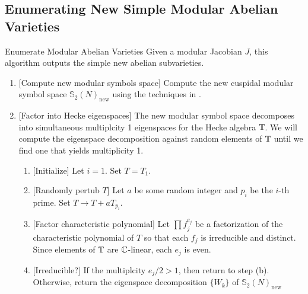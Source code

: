 \documentclass{article}
\begin{document}

\subsection{Enumerating New Simple Modular Abelian Varieties}

\begin{algorithm}{Enumerate Modular Abelian Varieties}
    \label{alg:new_simple_subs}
    Given a modular Jacobian $J$, this algorithm outputs the simple new abelian
    subvarieties.
    \begin{enumerate}
        \item{} [Compute new modular symbols space]
            Compute the new cuspidal modular symbol space
            $\mathbb{S}_2(N)_\mathrm{new}$ using the techniques in \cite[\S
            8]{stein:modular_forms:2007}.
        \item{} [Factor into Hecke eigenspaces]
            The new modular symbol space decomposes into simultaneous
            multiplcity 1 eigenspaces for the Hecke algebra $\mathbb{T}$. 
            We will compute the eigenspace decomposition against random
            elements of $\mathbb{T}$ until we find one that yields multiplicity 1.
            \begin{enumerate}
                \item{} [Initialize]
                    Let $i=1$. Set $T=T_1$.
                \item{} [Randomly pertub $T$]
                    Let $a$ be some random integer and $p_i$ be the $i$-th
                    prime. Set $T\to T+aT_{p_i}$.
                \item{} [Factor characteristic polynomial]
                    Let $\prod f_j ^{e_j}$ be a factorization of the characteristic
                    polynomial of $T$ so that each $f_j$ is irreducible and
                    distinct. Since elements of $\mathbb{T}$ are $\mathbb{C}$-linear, each
                    $e_j$ is even.
                \item{} [Irreducible?]
                    If the multiplcity $e_j/2>1$, then return to step (b).
                    Otherwise, return the eigenspace decomposition $\{W_{k}\}$
                    of $\mathbb{S}_2(N)_\mathrm{new}$
            \end{enumerate}
    \end{enumerate}
\end{algorithm}
\end{document}
